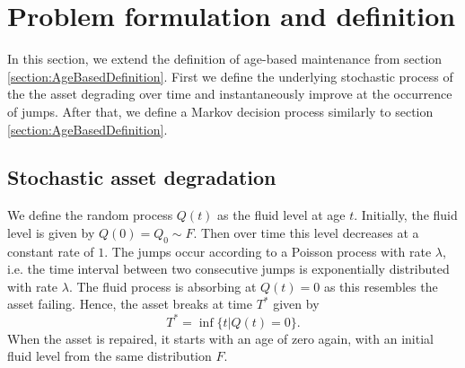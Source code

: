 \section{Problem formulation and definition}
In this section, we extend the definition of age-based maintenance from section \ref{section:AgeBasedDefinition}.
First we define the underlying stochastic process of the the asset degrading over time and instantaneously improve at the occurrence of jumps.
After that, we define a Markov decision process similarly to section \ref{section:AgeBasedDefinition}.

\subsection{Stochastic asset degradation}
We define the random process $Q(t)$ as the fluid level at age $t$.
Initially, the fluid level is given by $Q(0)=Q_0\sim F$.
Then over time this level decreases at a constant rate of $1$.
The jumps occur according to a Poisson process with rate $\lambda$, i.e. the time interval between two consecutive jumps is exponentially distributed with rate $\lambda$.
The fluid process is absorbing at $Q(t)=0$ as this resembles the asset failing.
Hence, the asset breaks at time $T^*$ given by
\[
T^*=\inf\{t|Q(t)=0\}.
\]
When the asset is repaired, it starts with an age of zero again, with an initial fluid level from the same distribution $F$.

